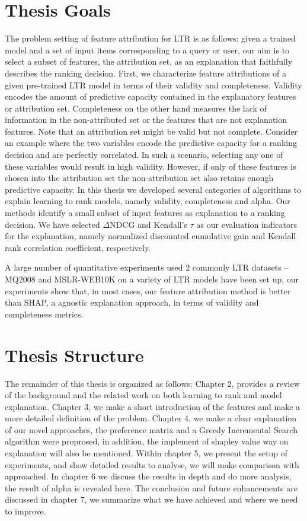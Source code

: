 \section{Thesis Goals}
The problem setting of feature attribution for LTR is as follows: given a trained model and a set of input items corresponding to a query or user, our aim is to select a subset of features, the attribution set, as an explanation that faithfully describes the ranking decision.
First, we characterize feature attributions of a given pre-trained LTR model in terms of their validity and completeness. Validity encodes the amount of predictive capacity contained in the explanatory features or attribution set. Completeness on the other hand measures the lack of information in the non-attributed set or the features that are not explanation features.
Note that an attribution set might be valid but not complete. Consider an example where the two variables encode the predictive capacity for a ranking decision and are perfectly correlated. In such a scenario, selecting any one of these variables would result in high validity. However, if only of these features is chosen into the attribution set the non-attribution set also retains enough predictive capacity. 
In this thesis we developed several categories of algorithms to explain learning to rank models, namely validity, completeness and alpha. Our methods identify a small subset of input features as explanation to a ranking decision. We have selected $\Delta$NDCG and Kendall's $\tau$ as our evaluation indicators for the explanation, namely normalized discounted cumulative gain and Kendall rank correlation coefficient, respectively.

A large number of quantitative experiments used 2 commonly LTR datasets -- MQ2008 and MSLR-WEB10K on a variety of LTR models have been set up, our experiments show that, in most cases, our feature attribution method is better than SHAP, a agnostic explanation approach, in terms of validity and completeness metrics.  

\section{Thesis Structure}
The remainder of this thesis is organized as follows: Chapter 2, provides a review of the background and the related work on both learning to rank and model explanation. Chapter 3, we make a short introduction of the features and make a more detailed definition of the problem. Chapter 4, we make a clear explanation of our novel approaches, the preference matrix and a Greedy Incremental Search algorithm were proprosed, in addition, the implement of shapley value way on explanation will also be mentioned. Within chapter 5, we present the setup of experiments, and show detailed results to analyse, we will make comparison with approached. In chapter 6 we discuss the results in depth and do more analysis, the result of alpha is revealed here. The conclusion and future enhancements are discussed in chapter 7, we summarize what we have achieved and where we need to improve.
